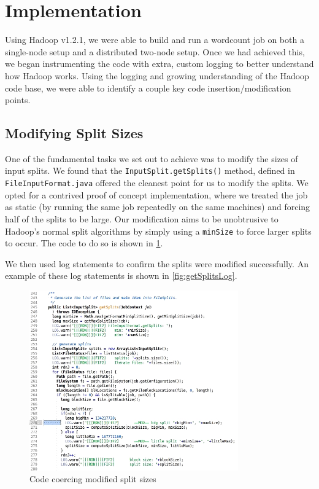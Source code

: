 \section{Implementation}
\label{section:implementation}
Using Hadoop v1.2.1, we were able to build and run a wordcount job
on both a single-node setup and a distributed two-node setup. Once
we had achieved this, we began instrumenting the code with extra,
custom logging to better understand how Hadoop works. Using the
logging and growing understanding of the Hadoop code base, we were
able to identify a couple key code insertion/modification points.

\subsection{Modifying Split Sizes}
One of the fundamental tasks we set out to achieve was to modify the
sizes of input splits. We found that the \texttt{InputSplit.getSplits()}
method, defined in \texttt{FileInputFormat.java} offered the cleanest
point for us to modify the splits. We opted for a contrived proof of
concept implementation, where we treated the job as static (by running
the same job repeatedly on the same machines) and forcing half of the
splits to be large. Our modification aims to be unobtrusive to Hadoop's
normal split algorithms by simply using a \texttt{minSize} to force larger
splits to occur. The code to do so is shown in \ref{fig:getSplitsCode}.

We then used log statements to confirm the splits were modified successfully.
An example of these log statements is shown in \ref{fig:getSplitsLog}.

\begin{figure}[ht!]
\centering
\includegraphics[width=90mm]{getSplitsCode.jpg}
\caption{Code coercing modified split sizes}
\label{fig:getSplitsCode}
\end{figure}

